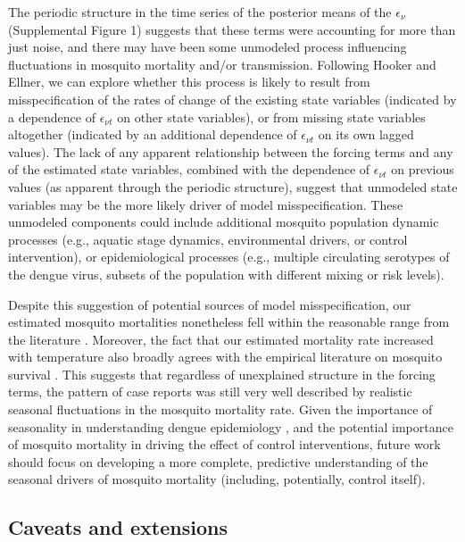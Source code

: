 \documentclass[10pt,letterpaper]{article}
\begin{document}
The periodic structure in the time series of the posterior means of the $\epsilon_{\nu}$ (Supplemental Figure 1) suggests that these terms were accounting for more than just noise, and there may have been some unmodeled process influencing fluctuations in mosquito mortality and/or transmission.
Following Hooker and Ellner, we can explore whether this process is likely to result from misspecification of the rates of change of the existing state variables (indicated by a dependence of $\epsilon_{\nu t}$ on other state variables), or from missing state variables altogether (indicated by an additional dependence of $\epsilon_{\nu t}$ on its own lagged values). 
The lack of any apparent relationship between the forcing terms and any of the estimated state variables, combined with the dependence of $\epsilon_{\nu t}$ on previous values (as apparent through the periodic structure), suggest that unmodeled state variables may be the more likely driver of model misspecification.
These unmodeled components could include additional mosquito population dynamic processes (e.g., aquatic stage dynamics, environmental drivers, or control intervention), or epidemiological processes (e.g., multiple circulating serotypes of the dengue virus, subsets of the population with different mixing or risk levels).

Despite this suggestion of potential sources of model misspecification, our estimated mosquito mortalities nonetheless fell within the reasonable range from the literature \cite{Maciel-de-Freitas2008, Brady2013}.
Moreover, the fact that our estimated mortality rate increased with temperature also broadly agrees with the empirical literature on mosquito survival \cite{Yang2009, Brady2013, Morin2013}.
This suggests that regardless of unexplained structure in the forcing terms, the pattern of case reports was still very well described by realistic seasonal fluctuations in the mosquito mortality rate.
Given the importance of seasonality in understanding dengue epidemiology \cite{TenBosch2016}, and the potential importance of mosquito mortality in driving the effect of control interventions, future work should focus on developing a more complete, predictive understanding of the seasonal drivers of mosquito mortality (including, potentially, control itself).

\subsection*{Caveats and extensions}
\end{document}
